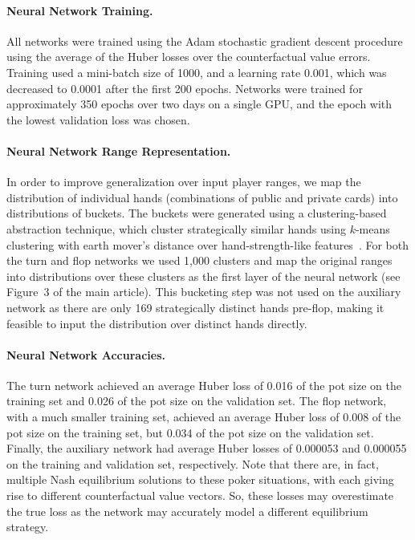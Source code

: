 \paragraph*{Neural Network Training.}
All networks were trained using the Adam stochastic gradient descent procedure \cite{kingma2014adam} using the average of the Huber losses over the counterfactual value errors.  Training used a mini-batch size of 1000, and a learning rate 0.001, which was decreased to 0.0001 after the first 200 epochs. 
Networks were trained for approximately 350 epochs over two days on a single GPU, and the epoch with the lowest validation loss was chosen. 

\paragraph*{Neural Network Range Representation.}
In order to improve generalization over input player ranges, we map the distribution of individual hands (combinations of public and private cards) into distributions of buckets.  The buckets were generated using a clustering-based abstraction technique, which cluster strategically similar hands using $k$-means clustering with earth mover's distance over hand-strength-like features~\cite{Johanson13:Abstraction,Ganzfried14:EMD}.  For both the turn and flop networks we used 1,000 clusters and map the original ranges into distributions over these clusters as the first layer of the neural network (see Figure~3 of the main article).  This bucketing step was not used on the auxiliary network as there are only 169 strategically distinct hands pre-flop, making it feasible to input the distribution over distinct hands directly.

\paragraph*{Neural Network Accuracies.}
The turn network achieved an average Huber loss of 0.016 of the pot size on the training set and 0.026 of the pot size on the validation set.   The flop network, with a much smaller training set, achieved an average Huber loss of 0.008 of the pot size on the training set, but 0.034 of the pot size on the validation set.  Finally, 
 the auxiliary network had average Huber losses of 0.000053 and 0.000055 on the training and validation set, respectively.
Note that there are, in fact, multiple Nash equilibrium solutions to these poker situations, with each giving rise to different counterfactual value vectors.  So, these losses may overestimate the true loss as the network may accurately model a different equilibrium strategy.

